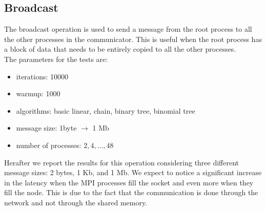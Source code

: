 
\subsection{Broadcast}
    The broadcast operation is used to send a message from the root
    process to all the other processes in the communicator. 
    This is useful when the root process has a block of data that needs
    to be entirely copied to all the other processes. \\
    The parameters for the tests are:
    \begin{itemize}
        \item iterations: 10000
        \item warmup: 1000
        \item algorithms: basic linear, chain, binary tree, binomial tree
        \item message size: 1byte $\rightarrow$ 1 Mb
        \item number of processes: $2, 4, \dots, 48$
    \end{itemize}
    Herafter we report the results for this operation considering three
    different message sizes: 2 bytes, 1 Kb, and 1 Mb. We expect to notice
    a significant increase in the latency when the MPI processes fill
    the socket and even more when they fill the node. This is due to the
    fact that the communication is done through the network and not through
    the shared memory.
